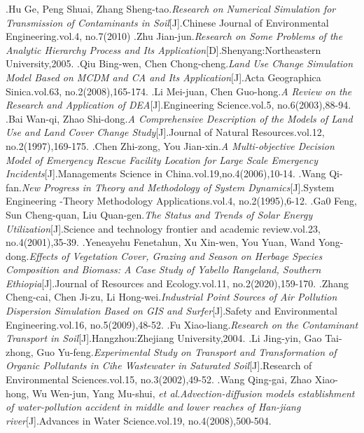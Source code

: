 \documentclass[./main.tex]{subfiles}
\begin{document}
    \begin{thebibliography}{99}
        \bibitem.Hu Ge, Peng Shuai, Zhang Sheng-tao.\emph{Research on Numerical Simulation for Transmission of Contaminants in Soil}[J].Chinese Journal of Environmental Engineering.vol.4, no.7(2010)
        \bibitem.Zhu Jian-jun.\emph{Research on Some Problems of the Analytic Hierarchy Process and Its Application}[D].Shenyang:Northeastern University,2005.
        \bibitem.Qiu Bing-wen, Chen Chong-cheng.\emph{Land Use Change Simulation Model Based on MCDM and CA and Its Application}[J].Acta Geographica Sinica.vol.63, no.2(2008),165-174.
        \bibitem.Li Mei-juan, Chen Guo-hong.\emph{A Review on the Research and Application of DEA}[J].Engineering Science.vol.5, no.6(2003),88-94.
        \bibitem.Bai Wan-qi, Zhao Shi-dong.\emph{A Comprehensive Description of the Models of Land Use and Land Cover Change Study}[J].Journal of Natural Resources.vol.12, no.2(1997),169-175.
        \bibitem.Chen Zhi-zong, You Jian-xin.\emph{A Multi-objective Decision Model of Emergency Rescue Facility Location for Large Scale Emergency Incidents}[J].Managements Science in China.vol.19,no.4(2006),10-14.
        \bibitem.Wang Qi-fan.\emph{New Progress in Theory and Methodology of System Dynamics}[J].System Engineering -Theory Methodology Applications.vol.4, no.2(1995),6-12.
        \bibitem.Ga0 Feng, Sun Cheng-quan, Liu Quan-gen.\emph{The Status and Trends of Solar Energy Utilization}[J].Science and technology frontier and academic review.vol.23, no.4(2001),35-39.
        \bibitem.Yeneayehu Fenetahun, Xu Xin-wen, You Yuan, Wand Yong-dong.\emph{Effects of Vegetation Cover, Grazing and Season on Herbage Species Composition and Biomass: A Case Study of Yabello Rangeland, Southern Ethiopia}[J].Journal of Resources and Ecology.vol.11, no.2(2020),159-170.
        \bibitem.Zhang Cheng-cai, Chen Ji-zu, Li Hong-wei.\emph{Industrial Point Sources of Air Pollution Dispersion Simulation Based on GIS and Surfer}[J].Safety and Environmental Engineering.vol.16, no.5(2009),48-52.
        \bibitem.Fu Xiao-liang.\emph{Research on the Contaminant Transport in Soil}[J].Hangzhou:Zhejiang University,2004.
        \bibitem.Li Jing-yin, Gao Tai-zhong, Guo Yu-feng.\emph{Experimental Study on Transport and Transformation of
        Organic Pollutants in Cihe Wastewater in Saturated Soil}[J].Research of Environmental Sciences.vol.15, no.3(2002),49-52.
        \bibitem.Wang Qing-gai, Zhao Xiao-hong, Wu Wen-jun, Yang Mu-shui, \textit{et al}.\emph{Advection-diffusion models establishment of water-pollution accident in middle and lower reaches of Han-jiang river}[J].Advances in Water Science.vol.19, no.4(2008),500-504.

\end{thebibliography}
\end{document}
